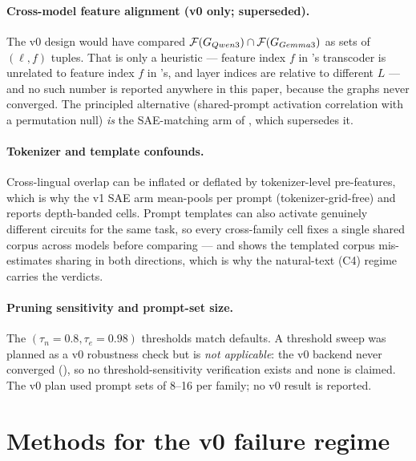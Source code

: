 \paragraph{Cross-model feature alignment (v0 only; superseded).} The v0 design would have
compared $\mathcal{F}(G_{\qwen{}})\cap
\mathcal{F}(G_{\gemma{}})$ as sets of $(\ell,f)$ tuples. That is only a heuristic --- feature
index $f$ in
\qwen{}'s transcoder is unrelated to feature index $f$ in \gemma{}'s, and layer indices are
relative to different $L$ --- and no such number is reported anywhere in this paper, because
the graphs never converged. The principled alternative (shared-prompt
activation correlation with a permutation null) \emph{is} the SAE-matching arm
of , which supersedes it.

\paragraph{Tokenizer and template confounds.} Cross-lingual overlap can be inflated or
deflated by tokenizer-level pre-features, which is why the v1 SAE arm mean-pools per prompt
(tokenizer-grid-free) and reports depth-banded cells. Prompt templates can also activate
genuinely different
circuits for the same task, so every cross-family cell fixes a single shared corpus across
models before comparing --- and  shows the templated corpus
mis-estimates sharing in both directions, which is why the natural-text (C4) regime carries
the verdicts.

\paragraph{Pruning sensitivity and prompt-set size.} The $(\tau_n{=}0.8,\tau_e{=}0.98)$
thresholds match \circuittracer{} defaults. A threshold sweep was planned as a v0 robustness
check but is \emph{not applicable}: the v0 backend never converged (),
so no threshold-sensitivity verification exists and none is claimed. The v0 plan used prompt
sets of 8--16 per family; no v0 result is reported.

\section{Methods for the v0 failure regime}\label{app:failure_methods}

